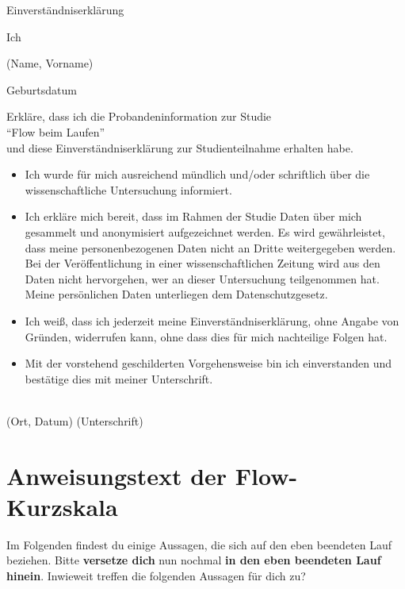 {\Huge Einverständniserklärung}\\
\begin{singlespace}
	Ich \hrulefill 
	\begin{center}
		(Name, Vorname) 
	\end{center}
	Geburtsdatum \hrulefill 
	\begin{center}
		Erkläre, dass ich die Probandeninformation zur Studie\\
		"`Flow beim Laufen"'\\
		und diese Einverständniserklärung zur Studienteilnahme erhalten habe. 
	\end{center}
	\begin{itemize}
		\item Ich wurde für mich ausreichend mündlich und/oder schriftlich über die wissenschaftliche Untersuchung informiert. 
		\item Ich erkläre mich bereit, dass im Rahmen der Studie Daten über mich gesammelt und anonymisiert aufgezeichnet werden. Es wird gewährleistet, dass meine personenbezogenen Daten nicht an Dritte weitergegeben werden. Bei der Veröffentlichung in einer wissenschaftlichen Zeitung wird aus den Daten nicht hervorgehen, wer an dieser Untersuchung teilgenommen hat. Meine persönlichen Daten unterliegen dem Datenschutzgesetz. 
		\item Ich weiß, dass ich jederzeit meine Einverständniserklärung, ohne Angabe von Gründen, widerrufen kann, ohne dass dies für mich nachteilige Folgen hat. 
		\item Mit der vorstehend geschilderten Vorgehensweise bin ich einverstanden und bestätige dies mit meiner Unterschrift. 
	\end{itemize}
	\vspace{15mm} \hrulefill \\
	(Ort, Datum) \hspace{20mm} (Unterschrift) 
\end{singlespace}
\newpage

\section{Anweisungstext der Flow-Kurzskala} 

\label{sec:anweisungstext_der_flow_kurzskala}

Im Folgenden findest du einige Aussagen, die sich auf den eben beendeten Lauf beziehen. Bitte \textbf{versetze dich} nun nochmal \textbf{in den eben beendeten Lauf hinein}. Inwieweit treffen die folgenden Aussagen für dich zu?

